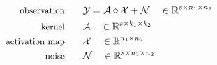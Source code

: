 \documentclass{article}
\begin{document}
\newcommand{\mc}{\mathcal}
\newcommand{\bbR}{\mathbb{R}}
\begin{align*}
\small\text{observation}\quad\quad &\mc Y = \mc A \diamond \mc X + \mc N \quad\in\bbR^{s\times n_1\times n_2}\\
\small\text{kernel}\quad\quad &\mc A \quad\in\bbR^{s\times k_1 \times k_2} \\
\small\text{activation map}\quad\quad &\mc X \quad\in\bbR^{n_1\times n_2} \\
\small\text{noise}\quad\quad &\mc N \quad\in\bbR^{s\times n_1\times n_2}
\end{align*}
\end{document}
